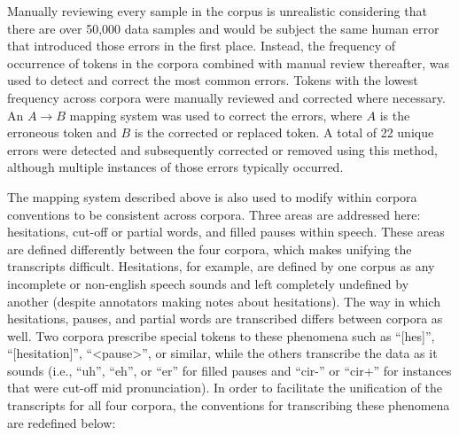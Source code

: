 \documentclass[12pt]{article}
\begin{document}
Manually reviewing every sample in the corpus is unrealistic considering that there are over 50,000 data samples and would be subject the same
human error that introduced those errors in the first place. Instead, the frequency of occurrence of tokens in the corpora combined with manual review
thereafter, was used to detect and correct the most common errors. Tokens with the lowest frequency across corpora were manually reviewed and
corrected where necessary. An \(A \rightarrow B\) mapping system was used to correct the errors, where \(A\) is the erroneous token and \(B\) is the
corrected or replaced token. A total of 22 unique errors were detected and subsequently corrected or removed using this method, although multiple
instances of those errors typically occurred.

The mapping system described above is also used to modify within corpora conventions to be consistent across corpora. Three areas are addressed here:
hesitations, cut-off or partial words, and filled pauses within speech. These areas are defined differently between the four corpora, which makes
unifying the transcripts difficult. Hesitations, for example, are defined by one corpus as any incomplete or non-english speech sounds and left
completely undefined by another (despite annotators making notes about hesitations). The way in which hesitations, pauses, and partial words are
transcribed differs between corpora as well. Two corpora prescribe special tokens to these phenomena such as ``[hes]'', ``[hesitation]'', ``<pause>'',
or similar, while the others transcribe the data as it sounds (i.e., ``uh'', ``eh'', or ``er'' for filled pauses and ``cir-'' or ``cir+'' for
instances that were cut-off mid pronunciation). In order to facilitate the unification of the transcripts for all four corpora, the conventions for
transcribing these phenomena are redefined below:
\end{document}
